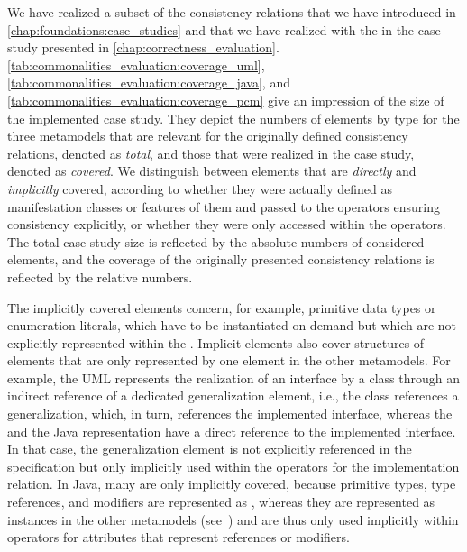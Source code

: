 We have realized a subset of the consistency relations that we have introduced in \autoref{chap:foundations:case_studies} and that we have realized with the \reactionslanguage in the case study presented in \autoref{chap:correctness_evaluation}.
\autoref{tab:commonalities_evaluation:coverage_uml}, \autoref{tab:commonalities_evaluation:coverage_java}, and \autoref{tab:commonalities_evaluation:coverage_pcm} give an impression of the size of the implemented case study.
They depict the numbers of elements by type for the three metamodels that are relevant for the originally defined consistency relations, denoted as \emph{total}, and those that were realized in the case study, denoted as \emph{covered}.
We distinguish between elements that are \emph{directly} and \emph{implicitly} covered, according to whether they were actually defined as manifestation classes or features of them and passed to the operators ensuring consistency explicitly, or whether they were only accessed within the operators.
The total case study size is reflected by the absolute numbers of considered elements, and the coverage of the originally presented consistency relations is reflected by the relative numbers.

The implicitly covered elements concern, for example, primitive data types or enumeration literals, which have to be instantiated on demand but which are not explicitly represented within the \commonalities.
Implicit elements also cover structures of elements that are only represented by one element in the other metamodels.
For example, the \gls{UML} represents the realization of an interface by a class through an indirect reference of a dedicated generalization element, i.e., the class references a generalization, which, in turn, references the implemented interface, whereas the \commonality and the Java representation have a direct reference to the implemented interface.
In that case, the generalization element is not explicitly referenced in the \commonality specification but only implicitly used within the operators for the implementation relation.
In Java, many \metaclasses are only implicitly covered, because primitive types, type references, and modifiers are represented as \metaclasses, whereas they are represented as instances in the other metamodels (see~) and are thus only used implicitly within operators for attributes that represent references or modifiers.

